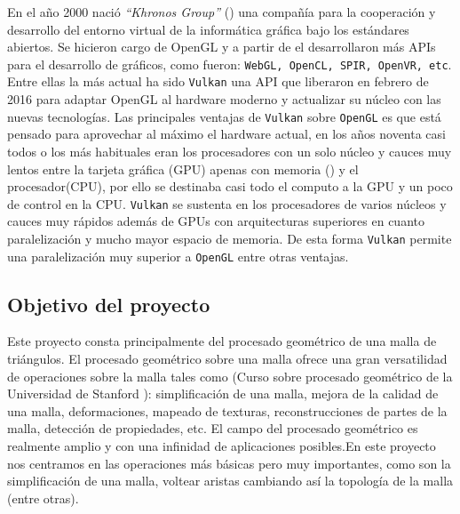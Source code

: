 En el año 2000 nació \textit{``Khronos Group''} (\cite{KhronosGroup2018}) una compañía para la cooperación y desarrollo del entorno virtual de la informática gráfica bajo los estándares abiertos. Se hicieron cargo de OpenGL y a partir de el desarrollaron más APIs para el desarrollo de gráficos, como fueron: \texttt{WebGL, OpenCL, SPIR, OpenVR, etc}. Entre ellas la más actual ha sido \texttt{Vulkan} una API que liberaron en febrero de 2016 para adaptar OpenGL al hardware moderno y actualizar su núcleo con las nuevas tecnologías. Las principales ventajas de \texttt{Vulkan} sobre \texttt{OpenGL} es que está pensado para aprovechar al máximo el hardware actual, en los años noventa casi todos o los más habituales eran los procesadores con un solo núcleo  y cauces muy lentos entre la tarjeta gráfica (GPU) apenas con memoria (\cite{NVIDIANV1}) y el procesador(CPU), por ello se destinaba casi todo el computo a la GPU y un poco de control en la CPU. \texttt{Vulkan} se sustenta en los procesadores de varios núcleos y cauces muy rápidos además de GPUs con arquitecturas superiores en cuanto paralelización y mucho mayor espacio de memoria. De esta forma \texttt{Vulkan} permite una paralelización muy superior a \texttt{OpenGL} entre otras ventajas.\\

\subsection{Objetivo del proyecto}
Este proyecto consta principalmente del procesado geométrico de una malla de triángulos. El procesado geométrico sobre una malla ofrece una gran versatilidad de operaciones sobre la malla tales como (Curso sobre procesado geométrico de la Universidad de Stanford \cite{mirelaben-chenCS468GeometryProcessing}):
simplificación de una malla, mejora de la calidad de una malla, deformaciones, mapeado de texturas, reconstrucciones de partes de la malla, detección de propiedades, etc. El campo del procesado geométrico es realmente amplio y con una infinidad de aplicaciones posibles.En este proyecto nos centramos en las operaciones más básicas pero muy importantes, como son la simplificación de una malla, voltear aristas cambiando así la topología de la malla (entre otras).

